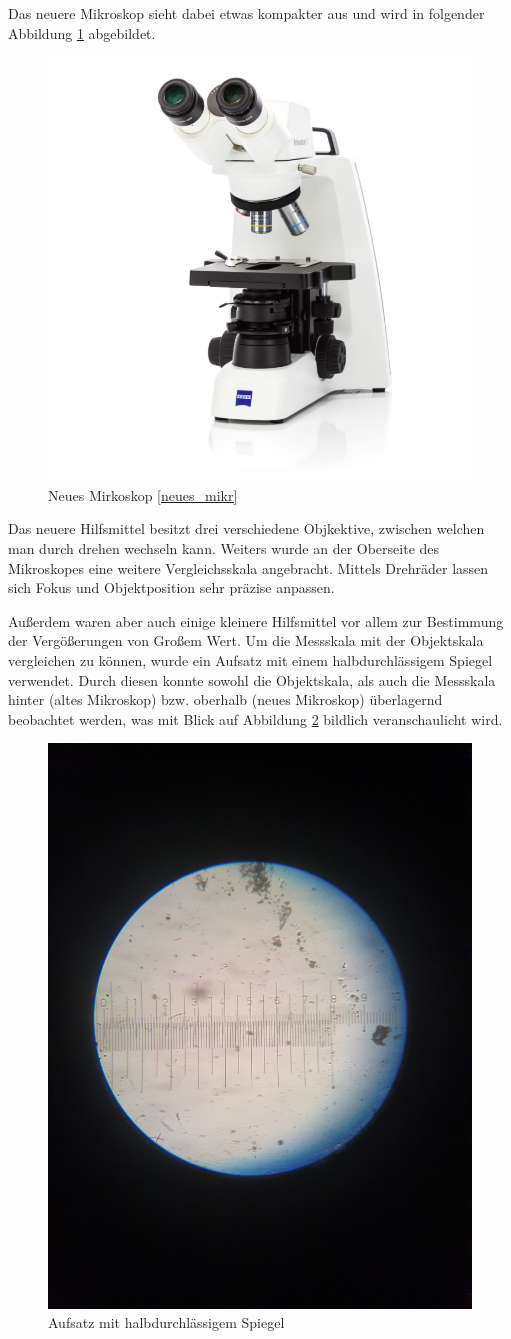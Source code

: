 \documentclass[12pt,a4paper,twoside]{article}
\begin{document}
    \noindent
    Das neuere Mikroskop sieht dabei etwas kompakter aus und wird in folgender Abbildung \ref{fig:Neues Mirkoskop} abgebildet.

    \begin{figure}[H]
        \centering
        \includegraphics[width=0.5\linewidth, angle=0]{nudes/neues_mikroskop.jpg}
        \caption{Neues Mirkoskop \ref{neues_mikr}}
        \label{fig:Neues Mirkoskop}
    \end{figure}

    \noindent
    Das neuere Hilfsmittel besitzt drei verschiedene Objkektive, zwischen welchen man durch drehen wechseln kann. Weiters wurde an der Oberseite des Mikroskopes eine weitere Vergleichsskala angebracht.
    Mittels Drehräder lassen sich Fokus und Objektposition sehr präzise anpassen. \newline
    
    \noindent
    Außerdem waren aber auch einige kleinere Hilfsmittel vor allem zur Bestimmung der Vergößerungen von Großem Wert. 
    Um die Messskala mit der Objektskala vergleichen zu können, wurde ein Aufsatz mit einem halbdurchlässigem Spiegel verwendet. 
    Durch diesen konnte sowohl die Objektskala, als auch die Messskala hinter (altes Mikroskop) bzw. oberhalb (neues Mikroskop) überlagernd beobachtet werden, was mit Blick auf Abbildung \ref*{fig:Aufsatz} bildlich veranschaulicht wird.

    \begin{figure}[H]
        \centering
        \includegraphics[width=0.5\linewidth, angle=0]{nudes/Aufsatz.jpg}
        \caption{Aufsatz mit halbdurchlässigem Spiegel}
        \label{fig:Aufsatz}
    \end{figure}        
\end{document}
